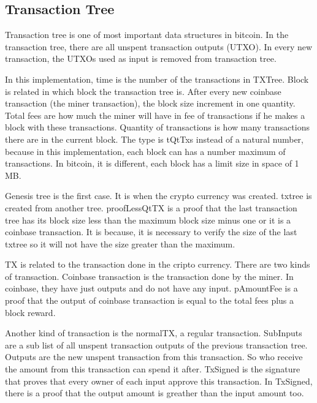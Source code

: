 \documentclass[12pt]{article}
\newcommand{\agda}[2]{\ExecuteMetaData[latex/#1.tex]{#2}}
\begin{document}
\subsection{Transaction Tree}

Transaction tree is one of most important data structures in bitcoin.
In the transaction tree, there are all unspent transaction outputs (UTXO).
In every new transaction, the UTXOs used as input is removed from transaction tree.

\agda{TXTree}{TXTree}

In this implementation, time is the number of the transactions in TXTree.
Block is related in which block the transaction tree is.
After every new coinbase transaction (the miner transaction), the block size increment in one quantity.
Total fees are how much the miner will have in fee of transactions if he makes a block with these
transactions.
Quantity of transactions is how many transactions there are in the current block.
The type is tQtTxs instead of a natural number, because in this implementation, each block can has
a number maximum of transactions.
In bitcoin, it is different, each block has a limit size in space of 1 MB.

Genesis tree is the first case.
It is when the crypto currency was created.
txtree is created from another tree.
proofLessQtTX is a proof that the last transaction tree has its
block size less than the maximum block size minus one or it is a coinbase transaction.
It is because, it is necessary to verify the size of the last txtree so it will not have
the size greater than the maximum.

\agda{TXTree}{TX}

TX is related to the transaction done in the cripto currency.
There are two kinds of transaction.
Coinbase transaction is the transaction done by the miner.
In coinbase, they have just outputs and do not have any input.
pAmountFee is a proof that the output of coinbase transaction is equal to the total fees plus
a block reward.

Another kind of transaction is the normalTX, a regular transaction.
SubInputs are a sub list of all unspent transaction outputs of the previous transaction tree.
Outputs are the new unspent transaction from this transaction.
So who receive the amount from this transaction can spend it after.
TxSigned is the signature that proves that every owner of each input approve this transaction.
In TxSigned, there is a proof that the output amount is greather than the input amount too.
\end{document}
